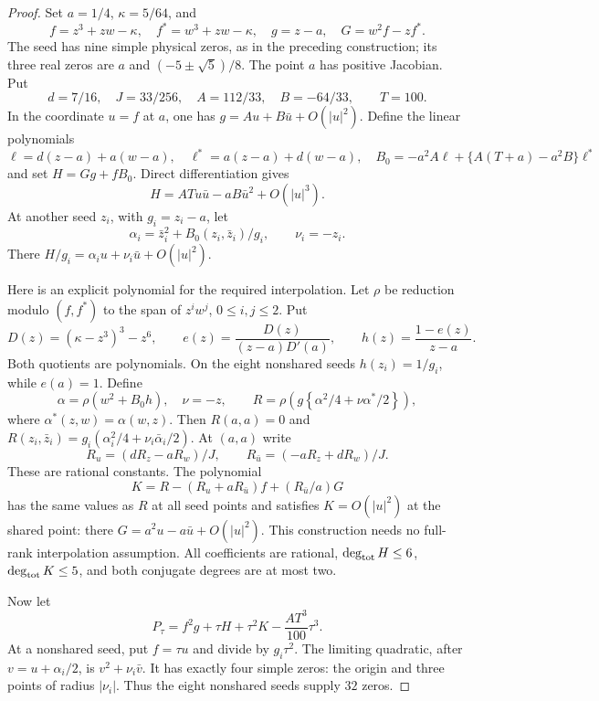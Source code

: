 \documentclass[UTF8,11pt]{ctexart}
\theoremstyle{definition}
\numberwithin{equation}{section}
\begin{document}
\begin{proof}
Set $a=1/4$, $\kappa=5/64$, and
\[
 f=z^3+zw-\kappa,\quad f^*=w^3+zw-\kappa,\quad g=z-a,
 \quad G=w^2f-zf^*.
\]
The seed has nine simple physical zeros, as in the preceding
construction; its three real zeros are $a$ and
$(-5\pm\sqrt5)/8$. The point $a$ has positive Jacobian.
Put
\[
 d=7/16,\quad J=33/256,\quad A=112/33,\quad B=-64/33,
 \qquad T=100.
\]
In the coordinate $u=f$ at $a$, one has
$g=Au+B\bar u+O(|u|^2)$. Define the linear polynomials
\[
 \ell=d(z-a)+a(w-a),\quad
 \ell^*=a(z-a)+d(w-a),\quad
 B_0=-a^2A\ell+\{A(T+a)-a^2B\}\ell^*
\]
and set $H=Gg+fB_0$. Direct differentiation gives
\begin{equation}\label{v37:eq:sharedH}
                  H=ATu\bar u-aB\bar u^2+O(|u|^3).
\end{equation}
At another seed $z_i$, with $g_i=z_i-a$, let
\[
 \alpha_i=\bar z_i^2+B_0(z_i,\bar z_i)/g_i,
 \qquad \nu_i=-z_i.
\]
There $H/g_i=\alpha_i u+\nu_i\bar u+O(|u|^2)$.

Here is an explicit polynomial for the required interpolation.
Let $\rho$ be reduction modulo $(f,f^*)$ to the span of
$z^iw^j$, $0\le i,j\le2$. Put
\[
 D(z)=(\kappa-z^3)^3-z^6,\qquad
 e(z)=\frac{D(z)}{(z-a)D'(a)},\qquad
 h(z)=\frac{1-e(z)}{z-a}.
\]
Both quotients are polynomials. On the eight nonshared seeds
$h(z_i)=1/g_i$, while $e(a)=1$. Define
\[
 \alpha=\rho(w^2+B_0h),\quad \nu=-z,\qquad
 R=\rho\left(g\left\{\alpha^2/4+\nu\alpha^*/2\right\}\right),
\]
where $\alpha^*(z,w)=\alpha(w,z)$. Then $R(a,a)=0$ and
$R(z_i,\bar z_i)=g_i(\alpha_i^2/4+\nu_i\bar\alpha_i/2)$.
At $(a,a)$ write
\[
 R_u=(dR_z-aR_w)/J,\qquad R_{\bar u}=(-aR_z+dR_w)/J.
\]
These are rational constants. The polynomial
\begin{equation}\label{v37:eq:K}
           K=R-(R_u+aR_{\bar u})f+(R_{\bar u}/a)G
\end{equation}
has the same values as $R$ at all seed points and satisfies
$K=O(|u|^2)$ at the shared point: there $G=a^2u-a\bar u+O(|u|^2)$.
This construction needs no full-rank interpolation assumption.
All coefficients are rational, $\deg_{\rm tot}H\le6$,
$\deg_{\rm tot}K\le5$, and both conjugate degrees are at most two.

Now let
\begin{equation}\label{v37:eq:family}
       P_\tau=f^2g+\tau H+\tau^2K-\frac{AT^3}{100}\tau^3.
\end{equation}
At a nonshared seed, put $f=\tau u$ and divide by $g_i\tau^2$.
The limiting quadratic, after $v=u+\alpha_i/2$, is
$v^2+\nu_i\bar v$. It has exactly four simple zeros:
the origin and three points of radius $|\nu_i|$.
Thus the eight nonshared seeds supply $32$ zeros.


\end{proof}
\end{document}

